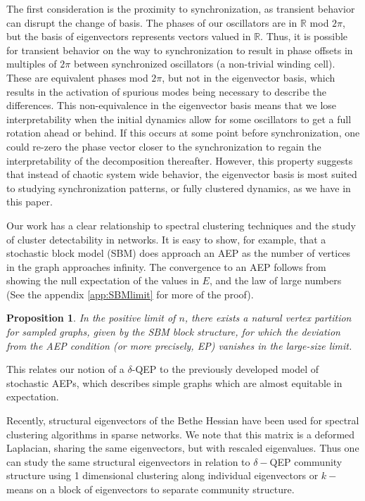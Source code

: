 \documentclass[%
 aip,
 amsmath,amssymb,
preprint,
reprint, onecolumn %
]{revtex4-1}
\newcommand{\R}{\mathbb{R}}
\newtheorem{prop}[theorem]{Proposition}
\begin{document}
The first consideration is the proximity to synchronization, as transient behavior can disrupt the change of basis. The phases of our oscillators are in $\R$ mod $2\pi$, but the basis of eigenvectors represents vectors valued in $\R$. Thus, it is possible for transient behavior on the way to synchronization to result in phase offsets in multiples of $2\pi$ between synchronized oscillators (a non-trivial winding cell). These are equivalent phases mod $2\pi$, but not in the eigenvector basis, which results in the activation of spurious modes being necessary to describe the differences. This non-equivalence in the eigenvector basis means that we lose interpretability when the initial dynamics allow for some oscillators to get a full rotation ahead or behind. If this occurs at some point before synchronization, one could re-zero the phase vector closer to the synchronization to regain the interpretability of the decomposition thereafter. However, this property suggests that instead of chaotic system wide behavior, the eigenvector basis is most suited to studying synchronization patterns, or fully clustered dynamics, as we have in this paper.

Our work has a clear relationship to spectral clustering techniques and the study of cluster detectability in networks. It is easy to show, for example, that a stochastic block model (SBM)  does approach an AEP as the number of vertices in the graph approaches infinity.
The convergence to an AEP follows from showing the null expectation of the values in $E$, and the law of large numbers (See the appendix \ref{app:SBMlimit} for more of the proof). 

\begin{prop}
    In the positive limit of $n$, there exists a natural vertex partition for sampled graphs, given by the SBM block structure, for which the deviation from the AEP condition (or more precisely, EP) vanishes in the large-size limit.
\end{prop}

This relates our notion of a $\delta$-QEP to the previously developed model of stochastic AEPs, which describes simple graphs which are almost equitable in expectation.\cite{schaub_hierarchical_2023}

Recently, structural eigenvectors of the Bethe Hessian have been used for spectral clustering algorithms in sparse networks.\cite{duan_spectral_2020} We note that this matrix is a deformed Laplacian, sharing the same eigenvectors, but with rescaled eigenvalues. Thus one can study the same structural eigenvectors\cite{krzakala_spectral_2013} in relation to $\delta-$QEP community structure using 1 dimensional clustering\cite{patania_exact_2023} along individual eigenvectors or $k-$means on a block of eigenvectors to separate community structure.
\end{document}

